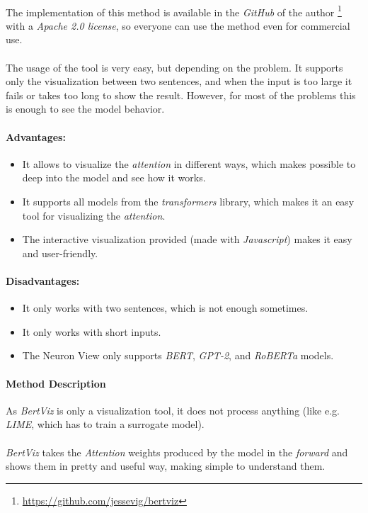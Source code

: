 \paragraph{}
The implementation of this method is available in the \emph{GitHub} of the author \footnote{\url{https://github.com/jessevig/bertviz}} with a \emph{Apache 2.0 license}, so everyone can use the method even for commercial use. 
\paragraph{}
The usage of the tool is very easy, but depending on the problem. It supports only the visualization between two sentences, and when the input is too large it fails or takes too long to show the result. However, for most of the problems this is enough to see the model behavior.
\paragraph{Advantages:}
\begin{itemize}
	\item It allows to visualize the \emph{attention} in different ways, which makes possible to deep into the model and see how it works.
	\item It supports all models from the \emph{transformers} library, which makes it an easy tool for visualizing the \emph{attention}.
	\item The interactive visualization provided (made with \emph{Javascript}) makes it easy and user-friendly.
\end{itemize}
\paragraph{Disadvantages:}
\begin{itemize}
	\item It only works with two sentences, which is not enough sometimes.
	\item It only works with short inputs.
	\item The Neuron View only supports \emph{BERT}, \emph{GPT-2}, and \emph{RoBERTa} models.
\end{itemize}
\paragraph{Method Description} 
As \emph{BertViz} is only a visualization tool, it does not process anything (like e.g. \emph{LIME}, which has to train a surrogate model).
\paragraph{}
\emph{BertViz} takes the \emph{Attention} weights produced by the model in the \emph{forward} and shows them in pretty and useful way, making simple to understand them. 

